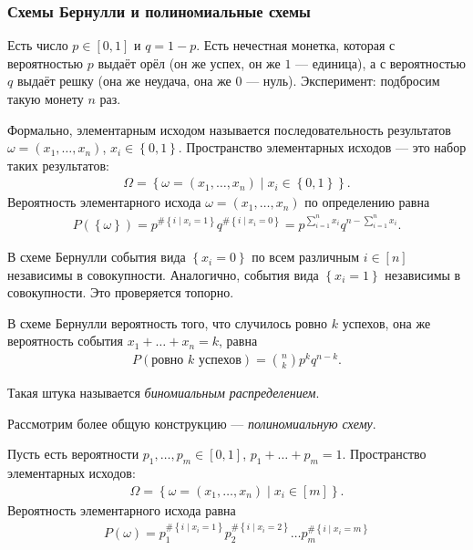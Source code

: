 
\subsubsection*{Схемы Бернулли и полиномиальные схемы}

\begin{df*}
 Есть число $p \in [0,1]$ и $q = 1 - p$. Есть нечестная монетка, которая с вероятностью $p$ выдаёт орёл (он же успех, он же $1$ --- единица), а с вероятностью $q$ выдаёт решку (она же неудача, она же $0$ --- нуль). Эксперимент: подбросим такую монету $n$ раз.

 Формально, элементарным исходом называется последовательность результатов $\omega = (x_1, \ldots, x_n)$, $x_i \in \left\{ 0,1 \right\}$. Пространство элементарных исходов --- это набор таких результатов:
 \begin{align*}
  \Omega = \left\{ \omega = (x_1, \ldots, x_n) \mid x_i \in \left\{ 0,1 \right\} \right\}.
 \end{align*} Вероятность элементарного исхода $\omega = (x_1, \ldots, x_n)$ по определению равна
 \begin{align*}
  P(\left\{ \omega \right\}) = p^{\# \left\{ i \mid x_i = 1 \right\}} q^{\# \left\{ i \mid x_i = 0 \right\}} = p^{\sum_{i=1}^{n} x_i} q^{n - \sum_{i=1}^{n} x_i}
 .\end{align*} 
\end{df*}

\begin{prop*}
 В схеме Бернулли события вида $\left\{ x_i = 0 \right\}$ по всем различным $i \in [n]$ независимы в совокупности. Аналогично, события вида $\left\{ x_i = 1 \right\}$  независимы в совокупности. Это проверяется топорно.
\end{prop*}

\begin{prop*}
 В схеме Бернулли вероятность того, что случилось ровно $k$ успехов, она же вероятность события $x_1 + \ldots + x_n = k$, равна
 \begin{align*}
  P(\text{ровно $k$ успехов}) = \binom n k p^{k} q^{n-k}
 .\end{align*} 
\end{prop*}
Такая штука называется \textit{биномиальным распределением}.

Рассмотрим более общую конструкцию --- \textit{полиномиальную схему}.
\begin{df*}
 Пусть есть вероятности $p_1, \ldots, p_m \in [0,1]$, $p_1 + \ldots + p_m = 1$. Пространство элементарных исходов:
 \begin{align*}
  \Omega = \left\{ \omega = (x_1, \ldots, x_n) \mid x_i \in [m] \right\}.
 \end{align*} Вероятность элементарного исхода равна
 \begin{align*}
  P(\omega) = p_1^{\# \left\{ i \mid x_i = 1 \right\}} p_2^{\# \left\{ i \mid x_i = 2 \right\}} \ldots p_m^{\# \left\{ i \mid x_i = m \right\}}
 \end{align*} 
\end{df*}

